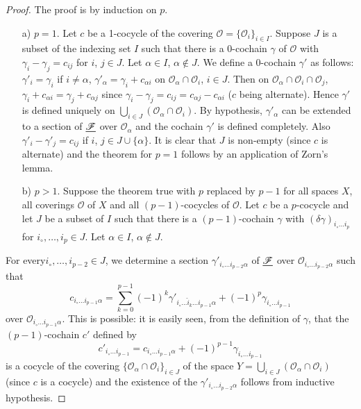 \begin{proof}
The proof is by induction on $p$. 
\begin{itemize}
\item[a)] $p=1$. Let $c$ be a 1-cocycle of the covering $\mathscr{O} =
  \{\mathscr{O}_i\}_{i \in I}$. Suppose $J$ is a subset of the
  indexing set $I$ such that there is a $0$-cochain $\gamma$ of
  $\mathscr{O}$ with $\gamma_i - \gamma_j = c_{ij}$ for $i$, $j \in
  J$. Let $\alpha \in I$, $\alpha \not\in J$. We define a 0-cochain
  $\gamma'$ as follows: $\gamma'_i = \gamma_i$ if $i \neq \alpha$,
  $\gamma'_{\alpha} = \gamma_i + c_{\alpha i}$ on $\mathscr{O}_{\alpha
  } \cap \mathscr{O}_i$, $i \in J$. Then on $\mathscr{O}_\alpha \cap
  \mathscr{O}_i \cap \mathscr{O}_j $, $\gamma_i + c_{\alpha i} =
  \gamma_j + c_{\alpha j}$ since $\gamma_i - \gamma_j = c_{ij} =
  c_{\alpha j} - c_{\alpha i}$ ($c$ being alternate). Hence $\gamma'$
  is defined uniquely on $\bigcup\limits_{i \in J} (\mathscr{O}_\alpha
  \cap \mathscr{O}_i)$. By hypothesis, $\gamma'_\alpha$ can be
  extended to a section of $\underline{\mathscr{F}}$ over $\mathscr{O}_\alpha$
  and the cochain $\gamma'$ is defined completely. Also $\gamma'_i -
  \gamma'_j = c_{ij}$ if $i$, $j \in J \cup \{\alpha\}$.  It is clear
  that $J$ is non-empty (since $c$ is alternate) and the theorem for
  $p=1$ follows by an application of Zorn's lemma. 

\item[b)] $p>1$. Suppose the theorem true with $p$ replaced by $p-1$ for
  all spaces $X$, all coverings $\mathscr{O}$ of $X$ and all
  $(p-1)$-cocycles of $\mathscr{O}$. Let $c$ be a $p$-cocycle and let
  $J$ be a subset of $I$ such that there is a $(p-1)$-cochain $\gamma$
  with $(\delta \gamma)_{i_\circ \ldots i_p}$ for $i_\circ, \ldots,
  i_p \in J$. Let $\alpha \in I$, $\alpha \not\in J$. 
\end{itemize}

For every\pageoriginale $i_\circ, \ldots, i_{p-2} \in J$, we determine
a section $\gamma'_{i_\circ \ldots i_{p-2} \alpha} $ of
$\underline{\mathscr{F}}$ over $\mathscr{O}_{i_\circ \ldots i_{p-2} \alpha}$
such that 
$$
c_{i_\circ \ldots i_{p-1}\alpha} = \sum\limits^{p-1}_{k=0} (-1)^k
\gamma'_{i_\circ \ldots \hat{i}_{k} \ldots i_{p-1} \alpha} + (-1)^p
\gamma_{i_\circ \ldots i_{p-1}}
$$
over $\mathscr{O}_{i_\circ \ldots i_{p-1} \alpha}$. This is possible:
it is easily seen, from the definition of $\gamma$, that the
$(p-1)$-cochain $c'$ defined by 
$$
c'_{i_\circ \ldots i_{p-1}} = c_{i_\circ \ldots i_{p-1} \alpha} +
(-1)^{p-1} \gamma_{i_\circ \ldots i_{p-1}}
$$
is a cocycle of the covering $\{\mathscr{O}_\alpha \cap
\mathscr{O}_i\}_{i \in J}$ of the space $Y = \bigcup\limits_{i \in J}
(\mathscr{O}_\alpha \cap \mathscr{O}_i)$ (since $c$ is a cocycle) and
the existence of the $\gamma'_{i_\circ \ldots i_{p-2}\alpha}$ follows
from inductive hypothesis.


\end{proof}
